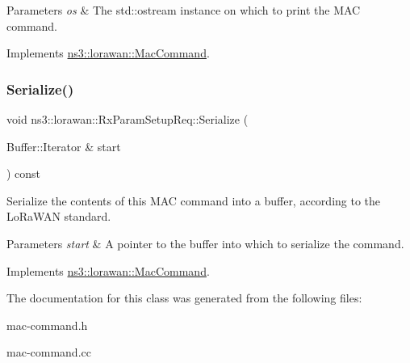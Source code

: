 \begin{DoxyParams}{Parameters}
{\em os} & The std\+::ostream instance on which to print the M\+AC command. \\
\hline
\end{DoxyParams}


Implements \hyperlink{classns3_1_1lorawan_1_1MacCommand_a6bf88db38dab7dcd817811a9fb59f920}{ns3\+::lorawan\+::\+Mac\+Command}.

\mbox{\label{classns3_1_1lorawan_1_1RxParamSetupReq_a61e2907f1dc9f06dd1e9cbd45a5583a1}} 
\subsubsection{\texorpdfstring{Serialize()}{Serialize()}}
{\footnotesize\ttfamily void ns3\+::lorawan\+::\+Rx\+Param\+Setup\+Req\+::\+Serialize (\begin{DoxyParamCaption}\item[{Buffer\+::\+Iterator \&}]{start }\end{DoxyParamCaption}) const\hspace{0.3cm}{\ttfamily [virtual]}}

Serialize the contents of this M\+AC command into a buffer, according to the Lo\+Ra\+W\+AN standard.


\begin{DoxyParams}{Parameters}
{\em start} & A pointer to the buffer into which to serialize the command. \\
\hline
\end{DoxyParams}


Implements \hyperlink{classns3_1_1lorawan_1_1MacCommand_a0ed44b33942ddc3dc9694dc06ab0b87f}{ns3\+::lorawan\+::\+Mac\+Command}.



The documentation for this class was generated from the following files\+:\begin{DoxyCompactItemize}
\item 
mac-\/command.\+h\item 
mac-\/command.\+cc\end{DoxyCompactItemize}
